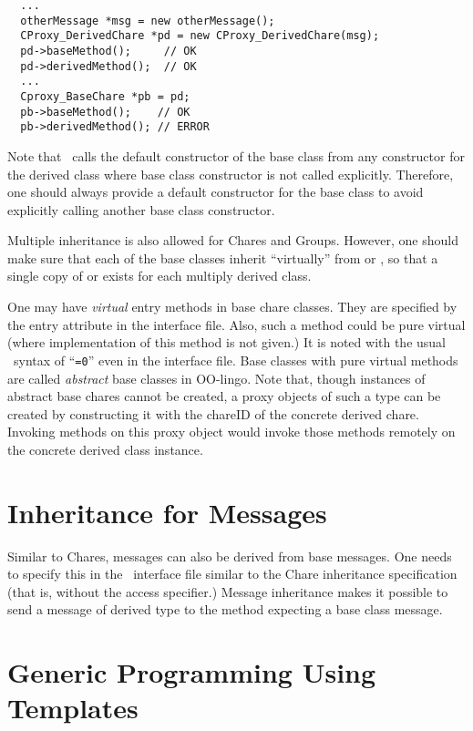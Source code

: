 \begin{verbatim}
  ...
  otherMessage *msg = new otherMessage();
  CProxy_DerivedChare *pd = new CProxy_DerivedChare(msg);
  pd->baseMethod();     // OK
  pd->derivedMethod();  // OK
  ...
  Cproxy_BaseChare *pb = pd;
  pb->baseMethod();    // OK
  pb->derivedMethod(); // ERROR
\end{verbatim}

Note that \CC\ calls the default constructor  of the base class from any
constructor for the derived class where base class constructor is not
called explicitly. Therefore, one should always provide a default constructor
for the base class to avoid explicitly calling another base class constructor.

Multiple inheritance  is also allowed for
Chares and Groups. However, one should make sure that each of the base
classes inherit ``virtually'' from  or , so that a
single copy of  or  exists for each multiply
derived class.

One may have {\em virtual} entry methods  in base chare
classes. They are specified by the entry attribute  in the
interface file. Also, such a method could be pure virtual  (where implementation of this method is not given.) It is
noted with the usual \CC\ syntax of ``{\tt =0}'' even in the interface
file. Base classes with pure virtual methods are called {\em abstract}
base classes  in OO-lingo. Note that,
though instances of abstract base chares cannot be created, a proxy
objects of such a type can be created by constructing it with the
chareID of the concrete derived chare. Invoking methods on this proxy
object would invoke those methods remotely on the concrete derived
class instance.

\section{Inheritance for Messages}

Similar to Chares, messages can also be derived from base messages. One needs
to specify this in the \charmpp\ interface file similar to the Chare
inheritance specification (that is, without the  access specifier.)
Message inheritance makes it possible to send a message of derived type to
the method expecting a base class message.

\section{Generic Programming Using Templates}

